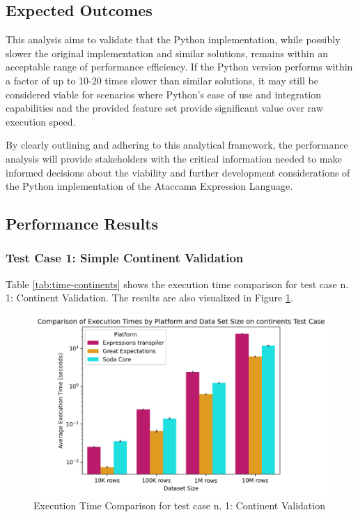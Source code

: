 \subsection{Expected Outcomes}

This analysis aims to validate that the Python implementation, while possibly slower the original implementation and similar solutions, remains within an acceptable range of performance efficiency. If the Python version performs within a factor of up to 10-20 times slower than similar solutions, it may still be considered viable for scenarios where Python’s ease of use and integration capabilities and the provided feature set provide significant value over raw execution speed. 

By clearly outlining and adhering to this analytical framework, the performance analysis will provide stakeholders with the critical information needed to make informed decisions about the viability and further development considerations of the Python implementation of the Ataccama Expression Language.

\subsection{Performance Results}

\subsubsection{Test Case 1: Simple Continent Validation}

Table \ref{tab:time-continents} shows the execution time comparison for test case n. 1: Continent Validation. The results are also visualized in Figure \ref{fig:time-comparison-continents}.

\begin{table}[h] 
    \footnotesize
    \centering 
    \caption{Execution Time Comparison for test case n. 1: Continent Validation} 
    \label{tab:time-continents} 
    
\end{table}

\begin{figure}[htbp]
  \centering
  \includegraphics[width=1.0\columnwidth]{result-analysis/plots/execution_time_comparison_continents.png}
  \caption{Execution Time Comparison for test case n. 1: Continent Validation}
  \label{fig:time-comparison-continents}
\end{figure}


